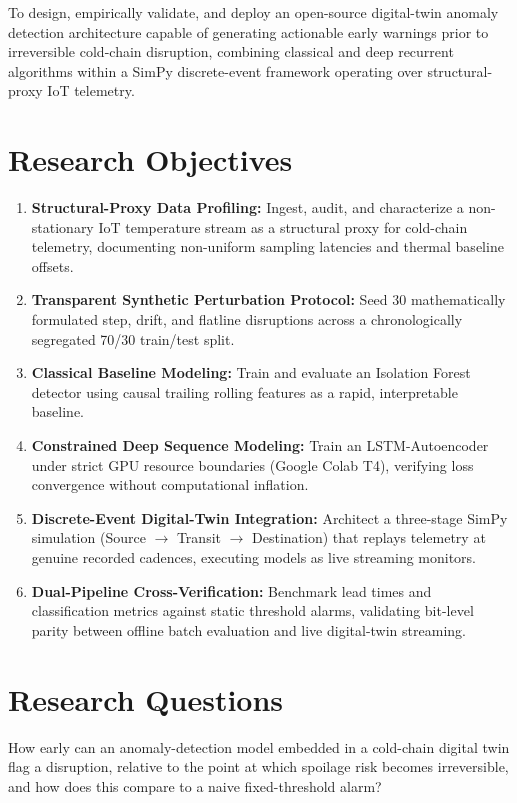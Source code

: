 \documentclass[11pt,a4paper,oneside]{report}
\begin{document}
To design, empirically validate, and deploy an open-source digital-twin anomaly detection architecture capable of generating actionable early warnings prior to irreversible cold-chain disruption, combining classical and deep recurrent algorithms within a SimPy discrete-event framework operating over structural-proxy IoT telemetry.

\section{Research Objectives}
\label{sec:objectives}

\begin{enumerate}[leftmargin=*,itemsep=3pt]
    \item \textbf{Structural-Proxy Data Profiling:} Ingest, audit, and characterize a non-stationary IoT temperature stream as a structural proxy for cold-chain telemetry, documenting non-uniform sampling latencies and thermal baseline offsets.
    \item \textbf{Transparent Synthetic Perturbation Protocol:} Seed 30 mathematically formulated step, drift, and flatline disruptions across a chronologically segregated 70/30 train/test split.
    \item \textbf{Classical Baseline Modeling:} Train and evaluate an Isolation Forest detector using causal trailing rolling features as a rapid, interpretable baseline.
    \item \textbf{Constrained Deep Sequence Modeling:} Train an LSTM-Autoencoder under strict GPU resource boundaries (Google Colab T4), verifying loss convergence without computational inflation.
    \item \textbf{Discrete-Event Digital-Twin Integration:} Architect a three-stage SimPy simulation (Source $\rightarrow$ Transit $\rightarrow$ Destination) that replays telemetry at genuine recorded cadences, executing models as live streaming monitors.
    \item \textbf{Dual-Pipeline Cross-Verification:} Benchmark lead times and classification metrics against static threshold alarms, validating bit-level parity between offline batch evaluation and live digital-twin streaming.
\end{enumerate}

\section{Research Questions}
\label{sec:rqs}

\begin{researchquestion}
How early can an anomaly-detection model embedded in a cold-chain digital twin flag a disruption, relative to the point at which spoilage risk becomes irreversible, and how does this compare to a naive fixed-threshold alarm?
\end{researchquestion}
\end{document}

